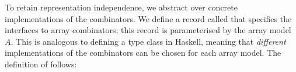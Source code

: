 To retain representation independence, we abstract over concrete
implementations of the combinators.  We define a record called 
that specifies the interfaces to array combinators; this record is
parameterised by the array model $A$.  This is analogous to defining a type
class in Haskell, meaning that \emph{different} implementations of the
combinators can be chosen for each array model.  The definition of
 follows:
\begin{code}%
%
\>[2]\AgdaSpace{}%
\AgdaSpace{}%
\AgdaSymbol{:}\AgdaSpace{}%
\AgdaSpace{}%
\<%
\\
\>[2][@{}l@{\AgdaIndent{0}}]%
\>[4]\<%
\\
\>[4][@{}l@{\AgdaIndent{0}}]%
\>[6]%
\>[15]\AgdaSymbol{:}\AgdaSpace{}%
\AgdaSpace{}%
\AgdaSpace{}%
\AgdaSpace{}%
\AgdaSpace{}%
\<%
\\
%
\>[6]%
\>[15]\AgdaSymbol{:}\AgdaSpace{}%
\AgdaSymbol{(}\AgdaSpace{}%
\AgdaSpace{}%
\AgdaSymbol{)}\AgdaSpace{}%
\AgdaSpace{}%
\AgdaSpace{}%
\AgdaSpace{}%
\AgdaSpace{}%
\AgdaSpace{}%
\AgdaSpace{}%
\AgdaSpace{}%
\<%
\\
%
\>[6]%
\>[15]\AgdaSymbol{:}\AgdaSpace{}%
\AgdaSpace{}%
\AgdaSymbol{(}\AgdaSpace{}%
\AgdaSpace{}%
\AgdaSymbol{)}\AgdaSpace{}%
\AgdaSpace{}%
\AgdaSpace{}%
\AgdaSpace{}%
\AgdaSpace{}%
\AgdaSymbol{(}\AgdaSpace{}%
\AgdaSpace{}%
\AgdaSymbol{)}\<%
\\
%
\>[6]%
\>[15]\AgdaSymbol{:}\AgdaSpace{}%
\AgdaSpace{}%
\AgdaSpace{}%
\AgdaSymbol{(}\AgdaSpace{}%
\AgdaSpace{}%
\AgdaSymbol{)}\AgdaSpace{}%
\AgdaSpace{}%
\AgdaSpace{}%
\AgdaSymbol{(}\AgdaSpace{}%
\AgdaSpace{}%
\AgdaSymbol{)}\AgdaSpace{}%
\<%
\\
%
\>[6]%
\>[15]\AgdaSymbol{:}\AgdaSpace{}%

\end{code}
